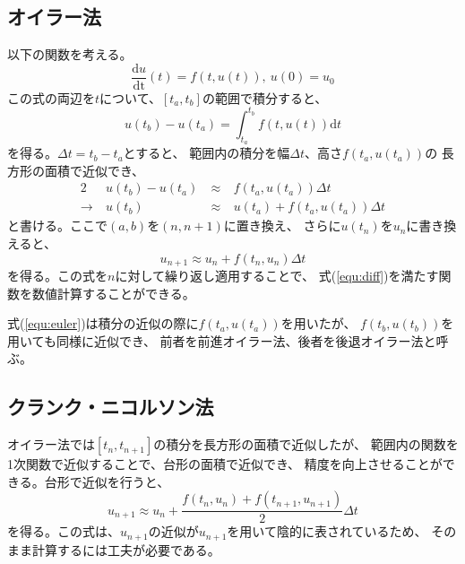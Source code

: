 \documentclass[a4j, titlepage]{jsarticle}
\numberwithin{equation}{section}
\begin{document}
    \subsection{オイラー法}
        以下の関数を考える。
        \begin{equation}
            \frac{\mathrm{d}u}{\mathrm{dt}}(t) = f(t, u(t)), \ u(0) = u_0 \label{equ:diff}
        \end{equation}
        この式の両辺を$t$について、$[t_a, t_b]$の範囲で積分すると、
        \begin{equation*}
            u(t_b) - u(t_a) = \int^{t_b}_{t_a}f(t, u(t))\mathrm{d}t
        \end{equation*}
        を得る。$\Delta t = t_b - t_a$とすると、
        範囲内の積分を幅$\Delta t$、高さ$f(t_a, u(t_a))$の
        長方形の面積で近似でき、
        \begin{alignat*}{2}
            & u(t_b) - u(t_a) & \ \approx \ & f(t_a, u(t_a))\Delta t \\
            \rightarrow \ & u(t_b) & \ \approx \ & u(t_a) + f(t_a, u(t_a))\Delta t
        \end{alignat*}
        と書ける。ここで$(a, b)$を$(n, n + 1)$に置き換え、
        さらに$u(t_n)$を$u_n$に書き換えると、
        \begin{equation}
            u_{n + 1} \approx u_n + f(t_n, u_n)\Delta t \label{equ:euler}
        \end{equation}
        を得る。この式を$n$に対して繰り返し適用することで、
        式(\ref{equ:diff})を満たす関数を数値計算することができる。

        式(\ref{equ:euler})は積分の近似の際に$f(t_a, u(t_a))$を用いたが、
        $f(t_b, u(t_b))$を用いても同様に近似でき、
        前者を前進オイラー法、後者を後退オイラー法と呼ぶ。

    \subsection{クランク・ニコルソン法} \label{sec:crank}
        オイラー法では$[t_n, t_{n+1}]$の積分を長方形の面積で近似したが、
        範囲内の関数を1次関数で近似することで、台形の面積で近似でき、
        精度を向上させることができる。台形で近似を行うと、
        \begin{equation}
            u_{n + 1} \approx u_n + \frac{f(t_n, u_n) + f(t_{n+1}, u_{n+1})}{2}\Delta t \label{equ:crank}
        \end{equation}
        を得る。この式は、$u_{n+1}$の近似が$u_{n+1}$を用いて陰的に表されているため、
        そのまま計算するには工夫が必要である。
\end{document}
